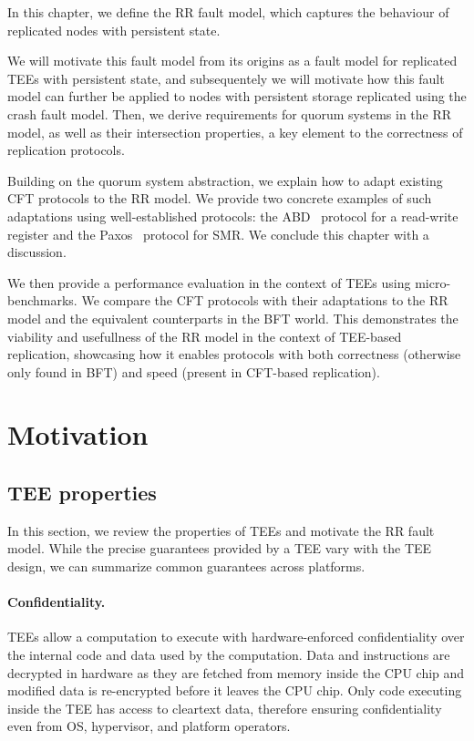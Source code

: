 \label{chap:model}
\cleardoublepage{}

In this chapter, we define the \ac{RR} fault model, which
captures the behaviour of replicated nodes with persistent state.

We will motivate this fault model from its origins as a fault model
for replicated \acp{TEE} with persistent state, and subsequentely
we will motivate how this fault model can further be applied to
nodes with persistent storage replicated using the crash fault
model. Then, we derive requirements for quorum systems in the
\ac{RR} model, as well as their intersection properties, a key element to the
correctness of replication protocols.

Building on the quorum system abstraction, we explain how to
adapt existing \ac{CFT} protocols to the \ac{RR} model. We
provide two concrete examples of such adaptations using
well-established protocols: the \ac{ABD}~\cite{abd} protocol for
a read-write register and the Paxos~\cite{paxos} protocol for
\ac{SMR}. We conclude this chapter with a discussion.

We then provide a performance evaluation in the context of
\acp{TEE} using micro-benchmarks. We compare the \ac{CFT}
protocols with their adaptations to the \ac{RR} model and the
equivalent counterparts in the \ac{BFT} world. This demonstrates
the viability and usefullness of the \ac{RR} model in the context
of \ac{TEE}-based replication, showcasing how it enables
protocols with both correctness (otherwise only found in
\ac{BFT}) and speed (present in \ac{CFT}-based replication).

\section{Motivation}\label{sec:motivation}

\subsection{\ac{TEE} properties}\label{ssec:tee_motivation}

In this section, we review the properties of \acp{TEE} and motivate the
\ac{RR} fault model. While the precise guarantees provided by a
\ac{TEE} vary with the \ac{TEE} design, we can summarize common guarantees across platforms.

\paragraph{Confidentiality.} \acp{TEE} allow a computation to execute with
hardware-enforced confidentiality over the internal code and data used
by the computation. Data and instructions are decrypted in hardware as
they are fetched from memory inside the CPU chip and modified data is
re-encrypted before it leaves the CPU chip. Only code executing inside
the \ac{TEE} has access to cleartext data, therefore ensuring
confidentiality even from \ac{OS}, hypervisor, and platform
operators.


